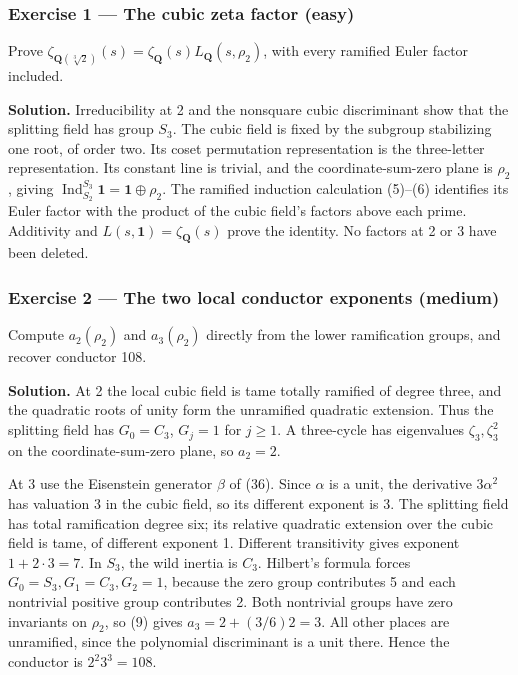 \documentclass[11pt,a4paper]{article}
\begin{document}
\subsubsection{Exercise 1 --- The cubic zeta factor
(easy)}\label{exercise-1-the-cubic-zeta-factor-easy}

Prove
\(\zeta_{\mathbf Q(\sqrt[3]2)}(s)=\zeta_{\mathbf Q}(s)L_{\mathbf Q}(s,\rho_2)\),
with every ramified Euler factor included.

\textbf{Solution.} Irreducibility at 2 and the nonsquare cubic
discriminant show that the splitting field has group \(S_3\). The cubic
field is fixed by the subgroup stabilizing one root, of order two. Its
coset permutation representation is the three-letter representation. Its
constant line is trivial, and the coordinate-sum-zero plane is
\(\rho_2\), giving
\(\operatorname{Ind}_{S_2}^{S_3}\mathbf1=\mathbf1\oplus\rho_2\). The
ramified induction calculation (5)--(6) identifies its Euler factor with
the product of the cubic field's factors above each prime. Additivity
and \(L(s,\mathbf1)=\zeta_{\mathbf Q}(s)\) prove the identity. No
factors at 2 or 3 have been deleted.

\subsubsection{Exercise 2 --- The two local conductor exponents
(medium)}\label{exercise-2-the-two-local-conductor-exponents-medium}

Compute \(a_2(\rho_2)\) and \(a_3(\rho_2)\) directly from the lower
ramification groups, and recover conductor 108.

\textbf{Solution.} At 2 the local cubic field is tame totally ramified
of degree three, and the quadratic roots of unity form the unramified
quadratic extension. Thus the splitting field has \(G_0=C_3\), \(G_j=1\)
for \(j\geq1\). A three-cycle has eigenvalues \(\zeta_3,\zeta_3^2\) on
the coordinate-sum-zero plane, so \(a_2=2\).

At 3 use the Eisenstein generator \(\beta\) of (36). Since \(\alpha\) is
a unit, the derivative \(3\alpha^2\) has valuation 3 in the cubic field,
so its different exponent is 3. The splitting field has total
ramification degree six; its relative quadratic extension over the cubic
field is tame, of different exponent 1. Different transitivity gives
exponent \(1+2\cdot3=7\). In \(S_3\), the wild inertia is \(C_3\).
Hilbert's formula forces \(G_0=S_3,G_1=C_3,G_2=1\), because the zero
group contributes 5 and each nontrivial positive group contributes 2.
Both nontrivial groups have zero invariants on \(\rho_2\), so (9) gives
\(a_3=2+(3/6)2=3\). All other places are unramified, since the
polynomial discriminant is a unit there. Hence the conductor is
\(2^2 3^3=108\).
\end{document}
